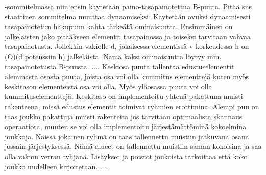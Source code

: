 \documentclass[finnish]{tktltiki2}
\theoremstyle{definition}
\theoremstyle{remark}
\begin{document}
-sommitelmassa niin ensin käytetään paino-tasapainotettua B-puuta. Pitää siis
staattinen sommitelma muuttaa dynaamiseksi. Käytetään avuksi dynaamisesti
tasapainotetun hakupuun kahta tärkeätä ominaisuutta. Ensimmäinen on
jälkeläisten jako pitääkseen elementit tasapainossa ja toiseksi tarvitaan
vahvaa tasapainotusta. Jollekkin vakiolle d, jokaisessa elementissä v
korkeudessa h on (O)(d potenssiin h) jälkeläistä. Nämä kaksi ominaisuutta
löytyy mm. tasapainotetusta B-puusta. ....
  Keskiosa puuta tallentaa edustuselementit alemmasta osasta puuta, joista osa
voi olla kummitus elementtejä kuten myös keskitason elementeistä osa voi olla.
Myös yläosassa puuta voi olla kummituselementtejä. Keskitaso on implementoitu
yhtenä pakattuna-muisti rakenteena, missä edustus elementit toimivat ryhmien
erottimina. Alempi puu on taas joukko pakattuja muisti rakenteita jos
tarvitaan optimaalista skannaus operaatiota, muuten se voi olla implementoitu
järjestämättöminä kokoelmina joukkoja. Näissä jokainen ryhmä on taas
tallennettu muistiin jatkuvana osana jossain järjestyksessä. Nämä alueet on
tallennettu muistiin saman kokoisina ja saa olla vakion verran tyhjänä.
Lisäykset ja poistot joukoista tarkoittaa että koko joukko uudelleen
kirjoitetaan. ....



%
%
% 
%



\end{document}
